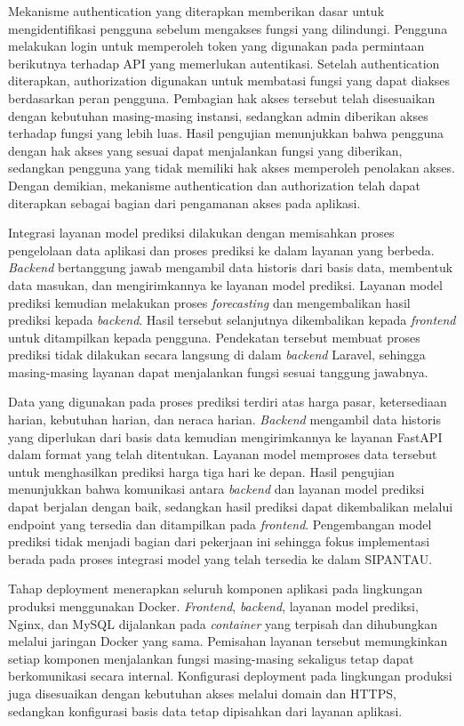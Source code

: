Mekanisme authentication yang diterapkan memberikan dasar untuk mengidentifikasi pengguna sebelum mengakses fungsi yang dilindungi. Pengguna melakukan login untuk memperoleh token yang digunakan pada permintaan berikutnya terhadap API yang memerlukan autentikasi. Setelah authentication diterapkan, authorization digunakan untuk membatasi fungsi yang dapat diakses berdasarkan peran pengguna. Pembagian hak akses tersebut telah disesuaikan dengan kebutuhan masing-masing instansi, sedangkan admin diberikan akses terhadap fungsi yang lebih luas. Hasil pengujian menunjukkan bahwa pengguna dengan hak akses yang sesuai dapat menjalankan fungsi yang diberikan, sedangkan pengguna yang tidak memiliki hak akses memperoleh penolakan akses. Dengan demikian, mekanisme authentication dan authorization telah dapat diterapkan sebagai bagian dari pengamanan akses pada aplikasi.

Integrasi layanan model prediksi dilakukan dengan memisahkan proses pengelolaan data aplikasi dan proses prediksi ke dalam layanan yang berbeda. \textit{Backend} bertanggung jawab mengambil data historis dari basis data, membentuk data masukan, dan mengirimkannya ke layanan model prediksi. Layanan model prediksi kemudian melakukan proses \textit{forecasting} dan mengembalikan hasil prediksi kepada \textit{backend}. Hasil tersebut selanjutnya dikembalikan kepada \textit{frontend} untuk ditampilkan kepada pengguna. Pendekatan tersebut membuat proses prediksi tidak dilakukan secara langsung di dalam \textit{backend} Laravel, sehingga masing-masing layanan dapat menjalankan fungsi sesuai tanggung jawabnya.

Data yang digunakan pada proses prediksi terdiri atas harga pasar, ketersediaan harian, kebutuhan harian, dan neraca harian. \textit{Backend} mengambil data historis yang diperlukan dari basis data kemudian mengirimkannya ke layanan FastAPI dalam format yang telah ditentukan. Layanan model memproses data tersebut untuk menghasilkan prediksi harga tiga hari ke depan. Hasil pengujian menunjukkan bahwa komunikasi antara \textit{backend} dan layanan model prediksi dapat berjalan dengan baik, sedangkan hasil prediksi dapat dikembalikan melalui endpoint yang tersedia dan ditampilkan pada \textit{frontend}. Pengembangan model prediksi tidak menjadi bagian dari pekerjaan ini sehingga fokus implementasi berada pada proses integrasi model yang telah tersedia ke dalam SIPANTAU.

Tahap deployment menerapkan seluruh komponen aplikasi pada lingkungan produksi menggunakan Docker. \textit{Frontend}, \textit{backend}, layanan model prediksi, Nginx, dan MySQL dijalankan pada \textit{container} yang terpisah dan dihubungkan melalui jaringan Docker yang sama. Pemisahan layanan tersebut memungkinkan setiap komponen menjalankan fungsi masing-masing sekaligus tetap dapat berkomunikasi secara internal. Konfigurasi deployment pada lingkungan produksi juga disesuaikan dengan kebutuhan akses melalui domain dan HTTPS, sedangkan konfigurasi basis data tetap dipisahkan dari layanan aplikasi.

